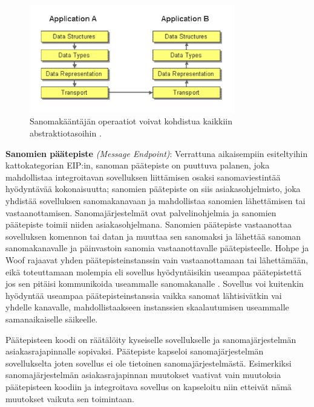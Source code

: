       \begin{figure}[h]
      \begin{center}
      \includegraphics[width=0.8\textwidth]{./kuvat/translation_layers.png}
      \caption{Sanomakääntäjän operaatiot voivat kohdistua kaikkiin abstraktiotasoihin \citep{Hohpe2004}\label{fig:translationlayers}.}
      \end{center}
      \end{figure}

    \textbf{Sanomien päätepiste} \textit{(Message Endpoint)}\label{Sanomien päätepiste}:
      Verrattuna aikaisempiin esiteltyihin kattokategorian EIP:in, sanoman päätepiste on puuttuva palanen, joka mahdollistaa integroitavan sovelluksen liittämisen osaksi sanomaviestintää hyödyntävää kokonaisuutta; sanomien päätepiste on siis asiakasohjelmisto, joka yhdistää sovelluksen sanomakanavaan ja mahdollistaa sanomien lähettämisen tai vastaanottamisen. Sanomajärjestelmät ovat palvelinohjelmia ja sanomien päätepiste toimii niiden asiakasohjelmana. 
      Sanomien päätepiste vastaanottaa sovelluksen komennon tai datan ja muuttaa sen sanomaksi ja lähettää sanoman sanomakanavalle ja päinvastoin sanomia vastaanottavalle päätepisteelle. Hohpe ja Woof rajaavat yhden päätepisteinstanssin vain vastaanottamaan tai lähettämään, eikä toteuttamaan molempia eli sovellus hyödyntäisikin useampaa päätepistettä jos sen pitäisi kommunikoida useammalle sanomakanalle \citep[sivu~106]{Hohpe2004}. Sovellus voi kuitenkin hyödyntää useampaa päätepisteinstanssia vaikka sanomat lähtisivätkin vai yhdelle kanavalle, mahdollistaakseen instanssien skaalautumisen useammalle samanaikaiselle säikeelle.

      Päätepisteen koodi on räätälöity kyseiselle sovellukselle ja sanomajärjestelmän asiakasrajapinnalle sopivaksi. Päätepiste kapseloi sanomajärjestelmän sovellukselta joten sovellus ei ole tietoinen sanomajärjestelmästä. Esimerkiksi sanomajärjestelmän asiakasrajapinnan muutokset vaativat vain muutoksia päätepisteen koodiin ja integroitava sovellus on kapseloitu niin etteivät nämä muutokset vaikuta sen toimintaan.

